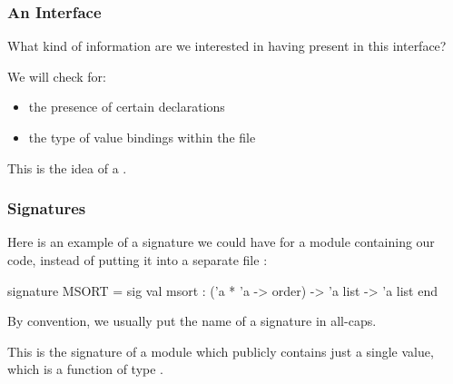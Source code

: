 \documentclass[aspectratio=169]{beamer}
\begin{document}
\begin{frame}[fragile]
  \frametitle{An Interface}


  \pause
  \vspace{\fill}

  What kind of information are we interested in having present in this interface?

  \pause
  \vspace{\fill}

  We will check for:
  \pause
  \begin{itemize}
    \item the presence of certain declarations \pause
    \item the type of value bindings within the file
  \end{itemize}

  \pause
  \vspace{\fill}

  This is the idea of a .
\end{frame}


\begin{frame}[fragile]
  \frametitle{Signatures}


  \pause
  \vspace{\fill}

  Here is an example of a signature we could have for a module containing our
   code, instead of putting it into a separate file :

  \begin{codeblock}
    signature MSORT =
      sig
        val msort : ('a * 'a -> order) -> 'a list -> 'a list
      end
  \end{codeblock}

  \vspace{\fill}

  By convention, we usually put the name of a signature in all-caps.

  \pause
  \vspace{\fill}

  This is the signature of a module which publicly contains just a single value,
  which is a function  of type .
\end{frame}
\end{document}
